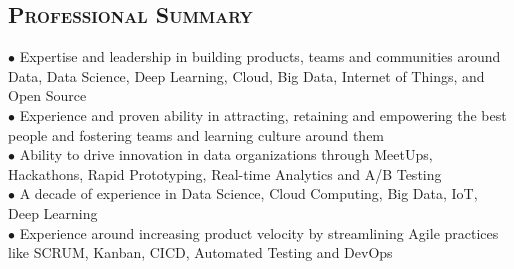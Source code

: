 \begin{resume}


\section{\textsc{Professional Summary}}
$\bullet$ Expertise and leadership in building products, teams and communities around Data, Data Science, Deep Learning, Cloud, Big Data, Internet of Things, and Open Source\\
$\bullet$ Experience and proven ability in attracting, retaining and empowering the best people and fostering teams and learning culture around them\\
$\bullet$ Ability to drive innovation in data organizations through MeetUps, Hackathons, Rapid Prototyping, Real-time Analytics and A/B Testing\\
$\bullet$ A decade of experience in Data Science, Cloud Computing, Big Data, IoT, Deep Learning\\
$\bullet$ Experience around increasing product velocity by streamlining Agile practices like SCRUM, Kanban, CICD, Automated Testing and DevOps


\end{resume}
